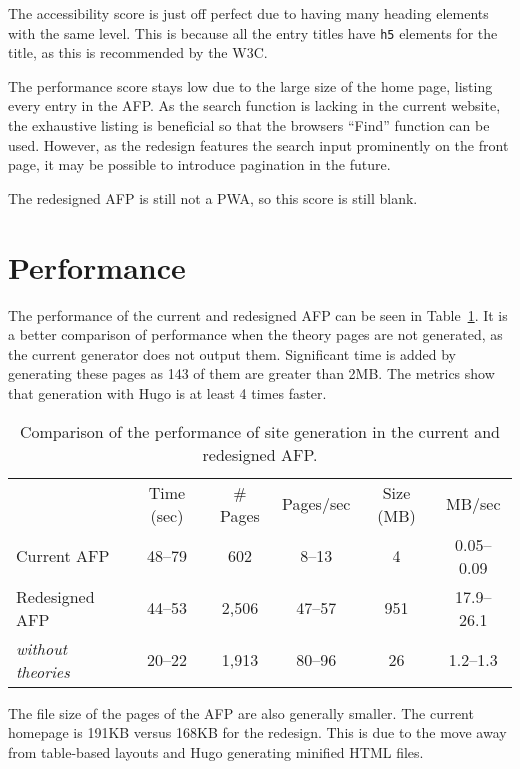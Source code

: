 \documentclass[bsc,frontabs,oneside,singlespacing,parskip,deptreport,logo]{infthesis}
\begin{document}
The accessibility score is just off perfect due to having many heading elements with the same level. This is because all the entry titles have \verb|h5| elements for the title, as this is recommended by the W3C.

The performance score stays low due to the large size of the home page, listing every entry in the AFP\@. As the search function is lacking in the current website, the exhaustive listing is beneficial so that the browsers ``Find'' function can be used. However, as the redesign features the search input prominently on the front page, it may be possible to introduce pagination in the future.

The redesigned AFP is still not a PWA, so this score is still blank.

\section{Performance} \label{sec:performance}

The performance of the current and redesigned AFP can be seen in Table~\ref{tab:performance}. It is a better comparison of performance when the theory pages are not generated, as the current generator does not output them. Significant time is added by generating these pages as 143 of them are greater than 2MB. The metrics show that generation with Hugo is at least 4 times faster.


\begin{table}[h]
\centering
{}
\begin{tabularx}{\textwidth}{lccccc}
                             & Time (sec) & \# Pages & Pages/sec & Size (MB) & MB/sec \\
Current AFP                  & 48--79          & 602      & 8--13             & 4      & 0.05--0.09     \\
Redesigned AFP               & 44--53          & 2,506    & 47--57            & 951       & 17.9--26.1     \\
\emph{without theories} & 20--22          & 1,913     & 80--96            & 26        & 1.2--1.3      
\end{tabularx}
\caption{Comparison of the performance of site generation in the current and redesigned AFP. }
\label{tab:performance}
\end{table}

The file size of the pages of the AFP are also generally smaller. The current homepage is 191KB versus 168KB for the redesign. This is due to the move away from table-based layouts and Hugo generating minified HTML files.
\end{document}
